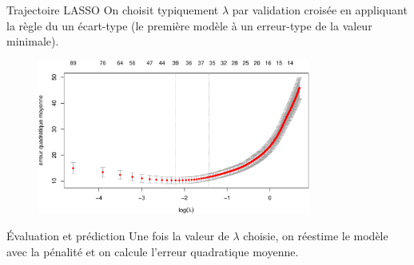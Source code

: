 \documentclass[
  ignorenonframetext,
]{beamer}
\newenvironment{Shaded}{\begin{snugshade}}{\end{snugshade}}
\newcommand{\AttributeTok}[1]{\textcolor[rgb]{0.40,0.45,0.13}{#1}}
\newcommand{\CommentTok}[1]{\textcolor[rgb]{0.37,0.37,0.37}{#1}}
\newcommand{\DecValTok}[1]{\textcolor[rgb]{0.68,0.00,0.00}{#1}}
\newcommand{\FunctionTok}[1]{\textcolor[rgb]{0.28,0.35,0.67}{#1}}
\newcommand{\NormalTok}[1]{\textcolor[rgb]{0.00,0.23,0.31}{#1}}
\newcommand{\OtherTok}[1]{\textcolor[rgb]{0.00,0.23,0.31}{#1}}
\newcommand{\SpecialCharTok}[1]{\textcolor[rgb]{0.37,0.37,0.37}{#1}}
\begin{document}
\begin{frame}{Trajectoire LASSO}
\protect\hypertarget{trajectoire-lasso}{}
On choisit typiquement \(\lambda\) par validation croisée en appliquant
la règle du un écart-type (le première modèle à un erreur-type de la
valeur minimale).

\begin{figure}

{\centering \includegraphics[width=0.8\textwidth,height=\textheight]{figures/fig-lassopath.pdf}

}

\end{figure}
\end{frame}

\begin{frame}[fragile]{Évaluation et prédiction}
\protect\hypertarget{uxe9valuation-et-pruxe9diction}{}
Une fois la valeur de \(\lambda\) choisie, on réestime le modèle avec la
pénalité et on calcule l'erreur quadratique moyenne.

\begin{Shaded}
\end{Shaded}
\end{frame}
\end{document}
